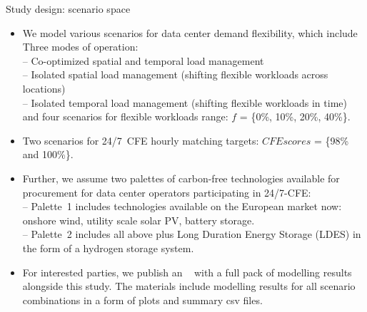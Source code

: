 \begin{frame}{Study design: scenario space}

  {\footnotesize 
  \begin{itemize}

  \item We model various scenarios for data center demand flexibility, which include \\
  \vspace{0.1cm}
  Three modes of operation: \\
    -- Co-optimized \alert{spatial and temporal} load management \\
    -- Isolated \alert{spatial} load management (shifting flexible workloads across locations)\\ 
    -- Isolated \alert{temporal} load management (shifting flexible workloads in time) \\ 
  \vspace{0.1cm}
  and four scenarios for flexible workloads range: \alert{$f$ = \{0\%, 10\%, 20\%, 40\%\}}.

  \item Two scenarios for 24/7~CFE hourly matching targets:
  \alert{$CFE scores$ = \{98\% and 100\%\}}.
  
  \item Further, we assume two palettes of carbon-free technologies available for procurement for data center operators participating in 24/7-CFE: \\
  \vspace{0.1cm}
  -- \alert{Palette~1} includes technologies available on the European market now: onshore wind, utility scale solar PV, battery storage. \\
  -- \alert{Palette~2} includes all above plus Long Duration Energy Storage (LDES) in the form of a hydrogen storage system. 

  \item For interested parties, we publish an \faLink~ with a full pack of modelling results alongside this study. The materials include modelling results for all scenario combinations in a form of plots and summary csv files. 

  \end{itemize}
  }
\end{frame}



